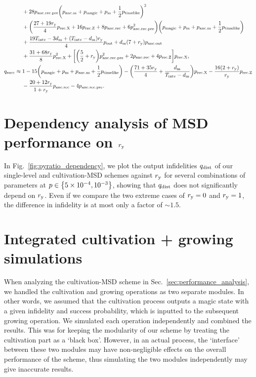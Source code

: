 \documentclass[
 prx,
 reprint,
 superscriptaddress,
 longbibliography,
 dvipsnames
]{revtex4-2}
\begin{document}
\begin{widetext}
\begin{align*}
    &+ 28p_\mr{anc.rec.pre} \qty(p_\mr{anc.m} + p_\mr{magic} + p_\mr{m} + \frac{1}{2} p_\mr{timelike})^2 \\
    &+ \qty(\frac{27 + 19 \pyratio}{4} p_\mr{rec.X} + 16 p_\mr{rec.Z} + 8p_\mr{anc.rec} + 6 p_\mr{anc.rec.pre}^{2}) \qty(p_\mr{magic} + p_\mr{m} + p_\mr{anc.m} + \frac{1}{2} p_\mr{timelike}) \\
    &+ \frac{19 T_\mr{intv} - 3 \dm + (T_\mr{intv} - \dm) \pyratio}{4} p_\mr{out} 
    + \dm \qty(7 + \pyratio) p_\mr{anc.out} \\
    &+ \frac{31 + 68 \pyratio}{8} p_\mr{rec.X}^{2} + \qty[\qty(\frac{5}{2} + \pyratio) p_\mr{anc.rec.pre}^2 + 2p_\mr{anc.rec} + 4p_\mr{rec.Z}] p_\mr{rec.X}, \\
    q_\mr{succ} \approx{}& 1 - 15 \qty(p_\mr{magic} + p_\mr{m} + p_\mr{anc.m} + \frac{1}{2} p_\mr{timelike})
    - \qty(\frac{71 + 35 \pyratio}{4} + \frac{\dm}{T_\mr{intv} - \dm}) p_\mr{rec.X}
    - \frac{16 \qty(2 + \pyratio)}{\pyratio} p_\mr{rec.Z} \\
    &- \frac{20 + 12 \pyratio}{1 + \pyratio} p_\mr{anc.rec}
    -4 p_\mr{anc.rec.pre}.
\end{align*}
\end{widetext}

\section{Dependency analysis of MSD performance on $\pyratio$ \label{app:pyratio_dependency}}

In Fig.~\ref{fig:pyratio_dependency}, we plot the output infidelities $q_\mr{dist}$ of our single-level and cultivation-MSD schemes against $\pyratio$ for several combinations of parameters at $p \in \qty{5 \times 10^{-4}, 10^{-3}}$, showing that $q_\mr{dist}$ does not significantly depend on $\pyratio$.
Even if we compare the two extreme cases of $\pyratio = 0$ and $\pyratio = 1$, the difference in infidelity is at most only a factor of $\sim 1.5$.

\section{Integrated cultivation + growing simulations \label{app:integrated_cult_growing_simulations}}

When analyzing the cultivation-MSD scheme in Sec.~\ref{sec:performance_analysis}, we handled the cultivation and growing operations as two separate modules.
In other words, we assumed that the cultivation process outputs a magic state with a given infidelity and success probability, which is inputted to the subsequent growing operation.
We simulated each operation independently and combined the results.
This was for keeping the modularity of our scheme by treating the cultivation part as a `black box'.
However, in an actual process, the `interface' between these two modules may have non-negligible effects on the overall performance of the scheme, thus simulating the two modules independently may give inaccurate results.
\end{document}
